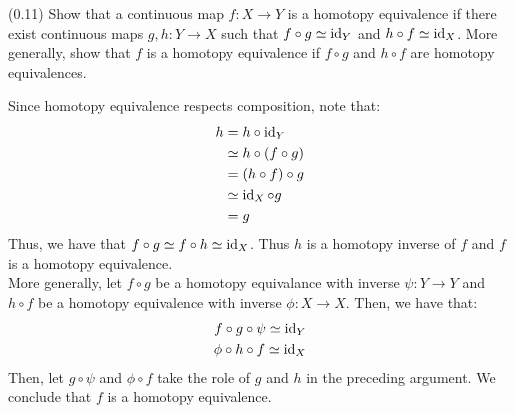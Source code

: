 \documentclass[12pt]{article}
\begin{document}
\begin{problem}{2}
    (0.11) Show that a continuous map $f: X \to Y$ is a homotopy equivalence if there exist continuous maps $g, h: Y \to X$ such that $f\circ g \simeq \operatorname{id}_Y$ and $h \circ f \simeq \operatorname{id}_X$. More generally, show that $f$ is a homotopy equivalence if $f \circ g$ and $h \circ f$ are homotopy equivalences.
\end{problem}
\begin{solution}
    Since homotopy equivalence respects composition, note that: 
    \begin{align*}
        h &= h \circ \operatorname{id}_Y \\
        &\simeq h \circ (f \circ g) \\
        &= (h \circ f) \circ g \\
        &\simeq \operatorname{id}_X \circ g \\
        &= g
    \end{align*}
    Thus, we have that $f \circ g \simeq f \circ h \simeq \operatorname{id}_X$. Thus $h$ is a homotopy inverse of $f$ and $f$ is a homotopy equivalence.\\
    More generally, let $f \circ g$ be a homotopy equivalance with inverse $\psi: Y \to Y$ and $h \circ f$ be a homotopy equivalence with inverse $\phi : X \to X$. Then, we have that: 
    \begin{align*}
        f \circ g \circ \psi \simeq \operatorname{id}_Y \\
        \phi \circ h \circ f \simeq \operatorname{id}_X    
    \end{align*}
    Then, let $g \circ \psi$ and $\phi \circ f$ take the role of $g$ and $h$ in the preceding argument. We conclude that $f$ is a homotopy equivalence.   
\end{solution}
\newpage
\end{document}
